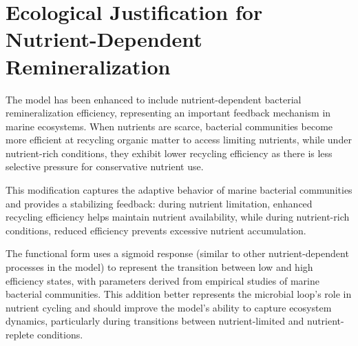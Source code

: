 \section{Ecological Justification for Nutrient-Dependent Remineralization}

The model has been enhanced to include nutrient-dependent bacterial remineralization efficiency, representing an important feedback mechanism in marine ecosystems. When nutrients are scarce, bacterial communities become more efficient at recycling organic matter to access limiting nutrients, while under nutrient-rich conditions, they exhibit lower recycling efficiency as there is less selective pressure for conservative nutrient use.

This modification captures the adaptive behavior of marine bacterial communities and provides a stabilizing feedback: during nutrient limitation, enhanced recycling efficiency helps maintain nutrient availability, while during nutrient-rich conditions, reduced efficiency prevents excessive nutrient accumulation.

The functional form uses a sigmoid response (similar to other nutrient-dependent processes in the model) to represent the transition between low and high efficiency states, with parameters derived from empirical studies of marine bacterial communities. This addition better represents the microbial loop's role in nutrient cycling and should improve the model's ability to capture ecosystem dynamics, particularly during transitions between nutrient-limited and nutrient-replete conditions.
